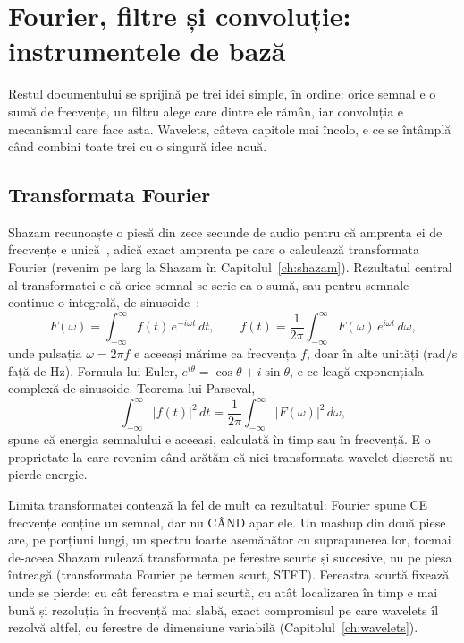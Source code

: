 \chapter{Fourier, filtre și convoluție: instrumentele de bază}
\label{ch:fundamente}

Restul documentului se sprijină pe trei idei simple, în ordine: orice semnal
e o sumă de frecvențe, un filtru alege care dintre ele rămân, iar convoluția
e mecanismul care face asta. Wavelets, câteva capitole mai încolo, e ce se
întâmplă când combini toate trei cu o singură idee nouă.

\section{Transformata Fourier}

Shazam recunoaște o piesă din zece secunde de audio pentru că amprenta ei de
frecvențe e unică~\cite{wang2003}, adică exact amprenta pe care o calculează
transformata Fourier (revenim pe larg la Shazam în
Capitolul~\ref{ch:shazam}). Rezultatul central al transformatei e că orice
semnal se scrie ca o sumă, sau pentru semnale continue o integrală, de
sinusoide~\cite{lyons2011}:
\[
F(\omega) = \int_{-\infty}^{\infty} f(t)\,e^{-i\omega t}\,dt, \qquad
f(t) = \frac{1}{2\pi}\int_{-\infty}^{\infty} F(\omega)\,e^{i\omega t}\,d\omega,
\]
unde pulsația $\omega = 2\pi f$ e aceeași mărime ca frecvența $f$, doar în alte
unități (rad/s față de Hz). Formula lui Euler, $e^{i\theta} = \cos\theta +
i\sin\theta$, e ce leagă exponențiala complexă de sinusoide. Teorema lui
Parseval,
\[
\int_{-\infty}^{\infty} |f(t)|^2\,dt = \frac{1}{2\pi}\int_{-\infty}^{\infty} |F(\omega)|^2\,d\omega,
\]
spune că energia semnalului e aceeași, calculată în timp sau în frecvență. E o
proprietate la care revenim când arătăm că nici transformata wavelet
discretă nu pierde energie.

Limita transformatei contează la fel de mult ca rezultatul: Fourier spune CE
frecvențe conține un semnal, dar nu CÂND apar ele. Un mashup din două piese
are, pe porțiuni lungi, un spectru foarte asemănător cu suprapunerea lor,
tocmai de-aceea Shazam rulează transformata pe ferestre scurte și succesive,
nu pe piesa întreagă (transformata Fourier pe termen scurt, STFT).
Fereastra scurtă fixează unde se pierde: cu cât fereastra e mai scurtă, cu
atât localizarea în timp e mai bună și rezoluția în frecvență mai slabă,
exact compromisul pe care wavelets îl rezolvă altfel, cu ferestre de
dimensiune variabilă (Capitolul~\ref{ch:wavelets}).


